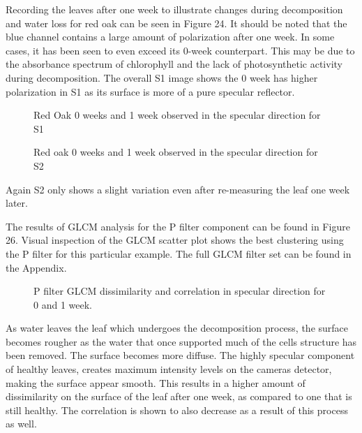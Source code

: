 Recording the leaves after one week to illustrate changes during decomposition and water loss for red oak can be seen in Figure 24.  It should be noted that the blue channel contains a large amount of polarization after one week. In some cases, it has been seen to even exceed its 0-week counterpart. This may be due to the absorbance spectrum of chlorophyll and the lack of photosynthetic activity during decomposition. The overall S1 image shows the 0 week has higher polarization in S1 as its surface is more of a pure specular reflector.
%
\begin{figure}[!htb]
    \begin{center}
    \end{center}
    \caption{Red Oak 0 weeks and 1 week observed in the specular direction for S1}
    \label{fig:polarization}
\end{figure}
%
\begin{figure}[!htb]
    \begin{center}
    \end{center}
    \caption{Red oak 0 weeks and 1 week observed in the specular direction for S2}
    \label{fig:polarization}
\end{figure}
%
Again S2 only shows a slight variation even after re-measuring the leaf one week later.

The results of GLCM analysis for the P filter component can be found in Figure 26.  Visual inspection of the GLCM scatter plot shows the best clustering using the P filter for this particular example.  The full GLCM filter set can be found in the Appendix.
%
\begin{figure}[!htb]
    \begin{center}
    \end{center}
    \caption{P filter GLCM dissimilarity and correlation in specular direction for 0 and 1 week.}
    \label{fig:polarization}
\end{figure}
%
As water leaves the leaf which undergoes the decomposition process, the surface becomes rougher as the water that once supported much of the cells structure has been removed. The surface becomes more diffuse.  The highly specular component of healthy leaves, creates maximum intensity levels on the cameras detector, making the surface appear smooth.  This results in a higher amount of dissimilarity on the surface of the leaf after one week, as compared to one that is still healthy.  The correlation is shown to also decrease as a result of this process as well.

